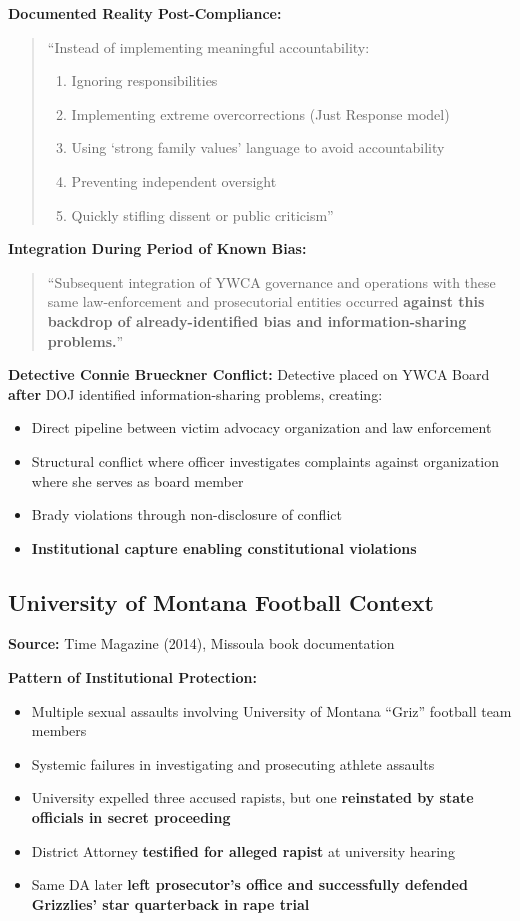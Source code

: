 \documentclass[11pt,letterpaper]{article}
\newenvironment{testimony}{%
    \begin{quote}\itshape\color{DarkGray}%
}{%
    \end{quote}%
}
\begin{document}
\textbf{Documented Reality Post-Compliance:}
\begin{testimony}
``Instead of implementing meaningful accountability:
\begin{enumerate}
\item Ignoring responsibilities
\item Implementing extreme overcorrections (Just Response model)
\item Using `strong family values' language to avoid accountability
\item Preventing independent oversight
\item Quickly stifling dissent or public criticism''
\end{enumerate}
\end{testimony}

\textbf{Integration During Period of Known Bias:}
\begin{testimony}
``Subsequent integration of YWCA governance and operations with these same law-enforcement and prosecutorial entities occurred \textbf{against this backdrop of already-identified bias and information-sharing problems.}''
\end{testimony}

\textbf{Detective Connie Brueckner Conflict:}
Detective placed on YWCA Board \textbf{after} DOJ identified information-sharing problems, creating:
\begin{itemize}[leftmargin=*]
\item Direct pipeline between victim advocacy organization and law enforcement
\item Structural conflict where officer investigates complaints against organization where she serves as board member
\item Brady violations through non-disclosure of conflict
\item \textbf{Institutional capture enabling constitutional violations}
\end{itemize}

\subsection{University of Montana Football Context}

\textbf{Source:} Time Magazine (2014), Missoula book documentation

\textbf{Pattern of Institutional Protection:}
\begin{itemize}[leftmargin=*]
\item Multiple sexual assaults involving University of Montana ``Griz'' football team members
\item Systemic failures in investigating and prosecuting athlete assaults
\item University expelled three accused rapists, but one \textbf{reinstated by state officials in secret proceeding}
\item District Attorney \textbf{testified for alleged rapist} at university hearing
\item Same DA later \textbf{left prosecutor's office and successfully defended Grizzlies' star quarterback in rape trial}
\end{itemize}
\end{document}
